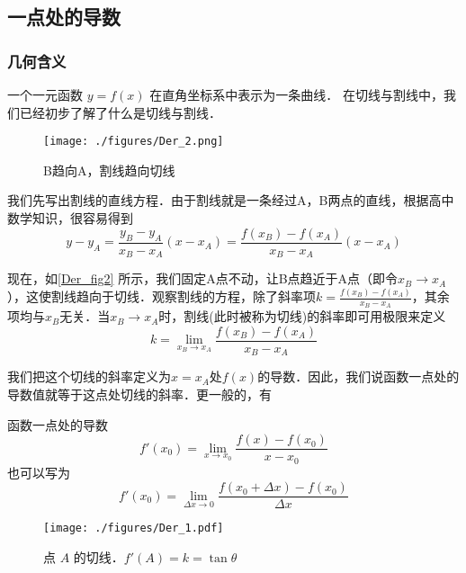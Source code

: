 

\subsection{一点处的导数}
\subsubsection{几何含义}
一个一元函数 $y = f(x)$ 在直角坐标系中表示为一条曲线． 在切线与割线中，我们已经初步了解了什么是切线与割线．

\begin{figure}[ht]
\centering
\texttt{[image: ./figures/Der\_2.png]}
\caption{B趋向A，割线趋向切线} \label{Der_fig2}
\end{figure}

我们先写出割线的直线方程．由于割线就是一条经过A，B两点的直线，根据高中数学知识，很容易得到
\begin{equation}
y-y_A=\frac{y_B-y_A}{x_B-x_A}(x-x_A)=\frac{f(x_B)-f(x_A)}{x_B-x_A}(x-x_A)
\end{equation}

现在，如\autoref{Der_fig2} 所示，我们固定A点不动，让B点趋近于A点（即令$x_B\rightarrow x_A$），这使割线趋向于切线．观察割线的方程，除了斜率项$k=\frac{f(x_B)-f(x_A)}{x_B-x_A}$，其余项均与$x_B$无关．当$x_B\rightarrow x_A$时，割线(此时被称为切线)的斜率即可用极限来定义
\begin{equation}
k=\lim_{x_B\to x_A}\frac{f(x_B)-f(x_A)}{x_B-x_A}
\end{equation}

我们把这个切线的斜率定义为$x=x_A$处$f(x)$的导数．因此，我们说函数一点处的导数值就等于这点处切线的斜率．更一般的，有
\begin{definition}{函数一点处的导数}
\begin{equation}
f'(x_0)=\lim_{x\to x_0}\frac{f(x)-f(x_0)}{x-x_0}
\end{equation}
也可以写为
\begin{equation}
f'(x_0)=\lim_{\Delta x\to0}\frac{f(x_0+\Delta x)-f(x_0)}{\Delta x}
\end{equation}
\end{definition}

\begin{figure}[ht]
\centering
\texttt{[image: ./figures/Der\_1.pdf]}
\caption{点 $A$ 的切线．$f'(A)=k=\tan \theta$}
\end{figure}

